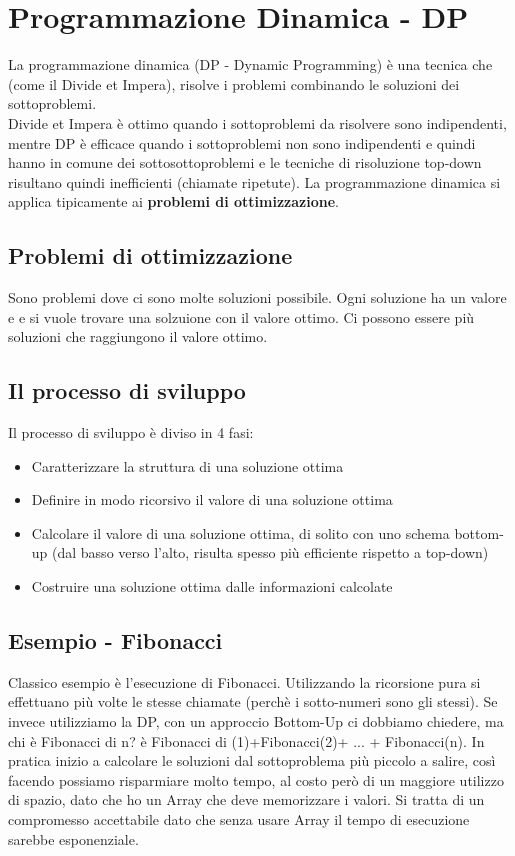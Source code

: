 \chapter{Programmazione Dinamica - DP}
La programmazione dinamica (DP - Dynamic Programming) è una tecnica che (come il Divide et Impera),
risolve i problemi combinando le soluzioni dei sottoproblemi.\\
Divide et Impera è ottimo quando i sottoproblemi da risolvere sono indipendenti,
mentre DP è efficace quando i sottoproblemi non sono indipendenti e quindi hanno in comune
dei sottosottoproblemi e le tecniche di risoluzione top-down risultano quindi inefficienti (chiamate ripetute).
La programmazione dinamica si applica tipicamente ai \textbf{problemi di ottimizzazione}.
\section{Problemi di ottimizzazione}
Sono problemi dove ci sono molte soluzioni possibile. Ogni soluzione ha un valore e e si vuole trovare una solzuione
con il valore  ottimo. Ci possono essere più soluzioni che raggiungono il valore ottimo.
\section{Il processo di sviluppo}
Il processo di sviluppo è diviso in 4 fasi:
\begin{itemize}
    \item Caratterizzare la struttura di una soluzione ottima
    \item Definire in modo ricorsivo il valore di una soluzione ottima
    \item Calcolare il valore di una soluzione ottima, di solito con uno schema bottom-up (dal basso verso
    l'alto, risulta spesso più efficiente rispetto a top-down)
    \item Costruire una soluzione ottima dalle informazioni calcolate
\end{itemize}
\section{Esempio - Fibonacci}
Classico esempio è l'esecuzione di Fibonacci. Utilizzando la ricorsione pura
si effettuano più volte le stesse chiamate (perchè i sotto-numeri sono gli stessi). Se invece
utilizziamo la DP, con un approccio Bottom-Up ci dobbiamo chiedere,
ma chi è Fibonacci di n? è Fibonacci di (1)+Fibonacci(2)+ ... + Fibonacci(n). In pratica
inizio a calcolare le soluzioni dal sottoproblema più piccolo a salire, così facendo possiamo risparmiare molto tempo,
al costo però di un maggiore utilizzo di spazio, dato che ho un Array che deve memorizzare i valori. Si tratta 
di un compromesso accettabile dato che senza usare Array il tempo di esecuzione sarebbe esponenziale.
